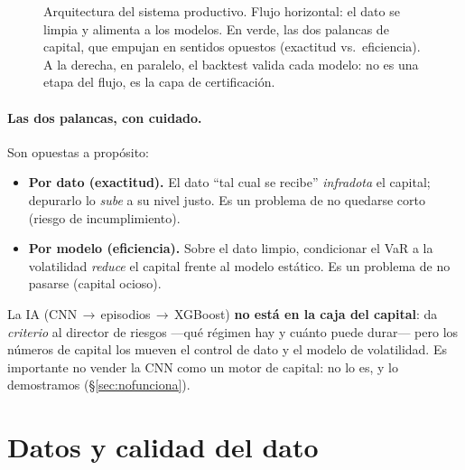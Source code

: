 \documentclass[11pt,a4paper]{article}
\begin{document}
\begin{figure}[H]
{}
\caption{Arquitectura del sistema productivo. Flujo horizontal: el dato se limpia
y alimenta a los modelos. En verde, las dos palancas de capital, que empujan en
sentidos opuestos (exactitud vs.\ eficiencia). A la derecha, en paralelo, el
backtest valida cada modelo: no es una etapa del flujo, es la capa de
certificación.}\label{fig:arq}
\end{figure}

\paragraph{Las dos palancas, con cuidado.} Son opuestas a propósito:
\begin{itemize}\itemsep1pt
\item \textbf{Por dato (exactitud).} El dato ``tal cual se recibe'' \emph{infradota}
el capital; depurarlo lo \emph{sube} a su nivel justo. Es un problema de no
quedarse corto (riesgo de incumplimiento).
\item \textbf{Por modelo (eficiencia).} Sobre el dato limpio, condicionar el VaR a
la volatilidad \emph{reduce} el capital frente al modelo estático. Es un problema
de no pasarse (capital ocioso).
\end{itemize}
La IA (CNN\,$\to$\,episodios\,$\to$\,XGBoost) \textbf{no está en la caja del
capital}: da \emph{criterio} al director de riesgos ---qué régimen hay y cuánto
puede durar--- pero los números de capital los mueven el control de dato y el
modelo de volatilidad. Es importante no vender la CNN como un motor de capital:
no lo es, y lo demostramos (§\ref{sec:nofunciona}).

\section{Datos y calidad del dato}
\end{document}
